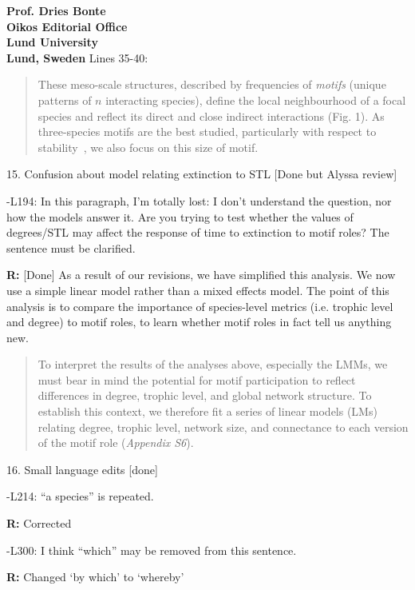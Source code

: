 \documentclass[12pt]{letter}
\begin{document}
\begin{letter}{\bf Prof. Dries Bonte\\
Oikos Editorial Office \\
Lund University \\
Lund, Sweden}
        Lines 35-40:
        
        \begin{quotation}
    	These meso-scale structures, described by frequencies of \emph{motifs} (unique patterns of $n$ interacting species), define the local neighbourhood of a focal species and reflect its direct and close indirect interactions (Fig. 1).
        As three-species motifs are the best studied, particularly with respect to stability~\citep{Stouffer2007,Borrelli2015,Borrelli2015a,giling2019plant}, we also focus on this size of motif.
        \end{quotation}



    15. Confusion about model relating extinction to STL [Done but Alyssa review]

      -L194: In this paragraph, I’m totally lost: I don’t understand the question, nor how the models answer it. Are you trying to test whether the values of degrees/STL may affect the response of time to extinction to motif roles? The sentence must be clarified.

      \textbf{R:} [Done]
      As a result of our revisions, we have simplified this analysis. We now use a simple linear model rather than a mixed effects model. The point of this analysis is to compare the importance of species-level metrics (i.e. trophic level and degree) to motif roles, to learn whether motif roles in fact tell us anything new.
      
      \begin{quotation}
      To interpret the results of the analyses above, especially the LMMs, we must bear in mind the potential for motif participation to reflect differences in degree, trophic level, and global network structure. 
      To establish this context, we therefore fit a series of linear models (LMs) relating degree, trophic level, network size, and connectance to each version of the motif role (\emph{Appendix S6}). 
      \end{quotation}
      


    16. Small language edits [done]

      -L214: ``a species'' is repeated.

        \textbf{R:} Corrected

      -L300: I think ``which'' may be removed from this sentence.

        \textbf{R:} Changed `by which' to `whereby'


\end{letter}
\end{document}
